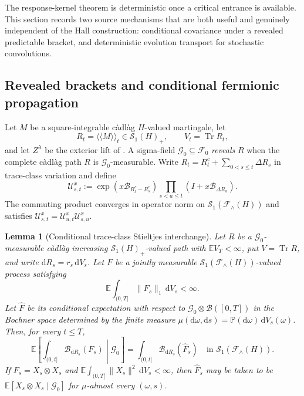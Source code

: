 \documentclass[10pt,reqno]{amsart}
\theoremstyle{plain}
\newtheorem{lemma}[theorem]{Lemma}
\theoremstyle{definition}
\theoremstyle{remark}
\begin{document}
The response-kernel theorem is deterministic once a critical entrance is
available.  This section records two source mechanisms that are both useful
and genuinely independent of the Hall construction: conditional covariance
under a revealed predictable bracket, and deterministic evolution transport
for stochastic convolutions.

\subsection{Revealed brackets and conditional fermionic propagation}

Let $M$ be a square-integrable c\`adl\`ag $H$-valued martingale, let
\[
 R_t=\langle\!\langle M\rangle\!\rangle_t\in\mathcal S_1(H)_+,
 \qquad V_t=\operatorname{Tr}R_t,
\]
and let $Z^\lambda$ be the exterior lift of
.  A sigma-field
$\mathcal G_0\subseteq\mathcal F_0$ \emph{reveals} $R$ when the complete
c\`adl\`ag path $R$ is $\mathcal G_0$-measurable.  Write
$R_t=R_t^c+\sum_{0<s\le t}\Delta R_s$ in trace-class variation and define
\begin{equation}
 \mathscr U^x_{s,t}
 :=\exp\!\left(x\mathcal B_{R_t^c-R_s^c}\right)
   \prod_{s<a\le t}(I+x\mathcal B_{\Delta R_a}).
 \label{eq:compact-fermionic-propagator}
\end{equation}
The commuting product converges in operator norm on
$\mathcal S_1(\mathcal F_\wedge(H))$ and satisfies
$\mathscr U^x_{s,t}=\mathscr U^x_{u,t}\mathscr U^x_{s,u}$.

\begin{lemma}[Conditional trace-class Stieltjes interchange]
\label{lem:conditional-stieltjes-interchange}
Let $R$ be a $\mathcal G_0$-measurable c\`adl\`ag increasing
$\mathcal S_1(H)_+$-valued path with $\mathbb EV_T<\infty$, put
$V=\operatorname{Tr}R$, and write
$\mathrm dR_s=r_s\,\mathrm dV_s$.  Let $F$ be a jointly measurable
$\mathcal S_1(\mathcal F_\wedge(H))$-valued process satisfying
\[
 \mathbb E\int_{(0,T]}\|F_s\|_1\,\mathrm dV_s<\infty.
\]
Let $\widehat F$ be its conditional expectation with respect to
$\mathcal G_0\otimes\mathcal B([0,T])$ in the Bochner space determined by
the finite measure
$\mu(\mathrm d\omega,\mathrm ds)=\mathbb P(\mathrm d\omega)\,
\mathrm dV_s(\omega)$.  Then, for every $t\le T$,
\begin{equation}
 \mathbb E\!\left[
  \int_{(0,t]}\mathcal B_{\mathrm dR_s}(F_s)
  \middle|\mathcal G_0\right]
 =\int_{(0,t]}\mathcal B_{\mathrm dR_s}(\widehat F_s)
 \quad\text{in }\mathcal S_1(\mathcal F_\wedge(H)).
 \label{eq:conditional-stieltjes-interchange}
\end{equation}
If $F_s=X_s\otimes X_s$ and
$\mathbb E\int_{(0,T]}\|X_s\|^2\,\mathrm dV_s<\infty$, then
$\widehat F_s$ may be taken to be
$\mathbb E[X_s\otimes X_s\mid\mathcal G_0]$ for $\mu$-almost every
$(\omega,s)$.
\end{lemma}
\end{document}
